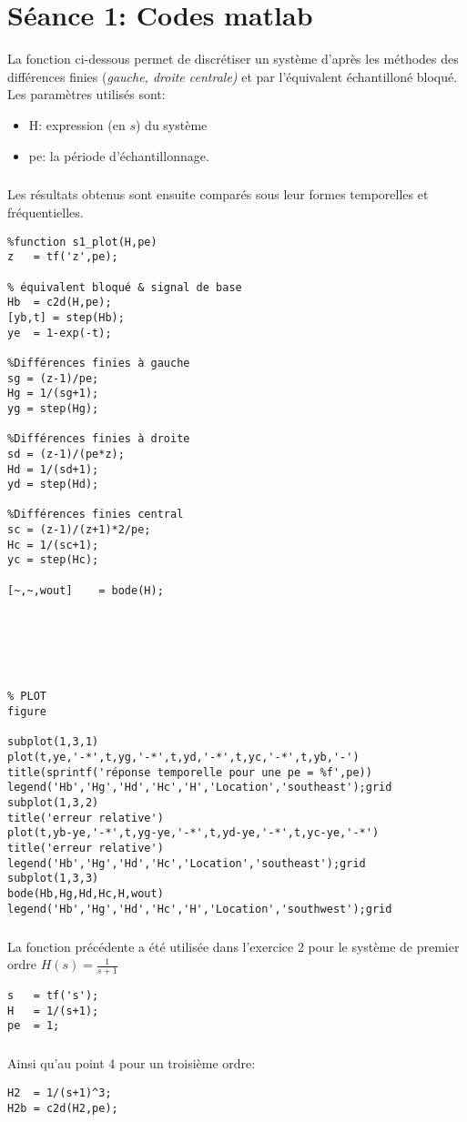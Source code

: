 \chapter{Séance 1: Codes matlab}\label{annexe-1}
La fonction ci-dessous permet de discrétiser un système d'après les méthodes des différences finies (\textit{gauche, droite centrale)} et par l'équivalent échantilloné bloqué. \\
Les paramètres utilisés sont:
\begin{itemize}[label=$\cdot$]
\item H:  expression (en $s$) du système
\item pe: la période d'échantillonnage.
\end{itemize} 
\paragraph{}
Les résultats obtenus sont ensuite comparés sous leur formes temporelles et fréquentielles.

{\footnotesize\begin{verbatim}
%function s1_plot(H,pe)
z   = tf('z',pe);

% équivalent bloqué & signal de base
Hb  = c2d(H,pe);
[yb,t] = step(Hb);
ye  = 1-exp(-t);

%Différences finies à gauche
sg = (z-1)/pe;
Hg = 1/(sg+1);
yg = step(Hg);

%Différences finies à droite
sd = (z-1)/(pe*z);
Hd = 1/(sd+1);
yd = step(Hd);

%Différences finies central
sc = (z-1)/(z+1)*2/pe;
Hc = 1/(sc+1);
yc = step(Hc);

[~,~,wout]    = bode(H);






% PLOT
figure

subplot(1,3,1)
plot(t,ye,'-*',t,yg,'-*',t,yd,'-*',t,yc,'-*',t,yb,'-')
title(sprintf('réponse temporelle pour une pe = %f',pe))
legend('Hb','Hg','Hd','Hc','H','Location','southeast');grid
subplot(1,3,2)
title('erreur relative')
plot(t,yb-ye,'-*',t,yg-ye,'-*',t,yd-ye,'-*',t,yc-ye,'-*')
title('erreur relative')
legend('Hb','Hg','Hd','Hc','Location','southeast');grid
subplot(1,3,3)
bode(Hb,Hg,Hd,Hc,H,wout)
legend('Hb','Hg','Hd','Hc','H','Location','southwest');grid
\end{verbatim}}

\paragraph{}
La fonction précédente a été utilisée dans l'exercice 2 pour le système de premier ordre $H(s)=\frac{1}{s+1}$
{\footnotesize\begin{verbatim}
s   = tf('s');
H   = 1/(s+1);
pe  = 1; 
\end{verbatim}}

\paragraph{}
Ainsi qu'au point 4 pour un troisième ordre:
{\footnotesize\begin{verbatim}
H2  = 1/(s+1)^3;
H2b = c2d(H2,pe);
\end{verbatim}}